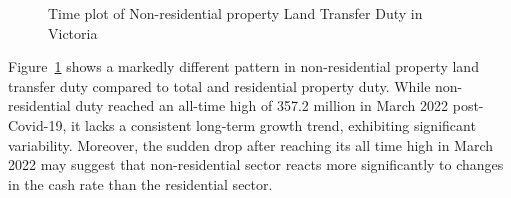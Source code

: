 \documentclass[
  11pt,
  a4paper,
]{article}
\begin{document}
\begin{figure}


\caption{\label{fig-nonrestrend}Time plot of Non-residential property
Land Transfer Duty in Victoria}

\end{figure}%

Figure~\ref{fig-nonrestrend} shows a markedly different pattern in
non-residential property land transfer duty compared to total and
residential property duty. While non-residential duty reached an
all-time high of 357.2 million in March 2022 post-Covid-19, it lacks a
consistent long-term growth trend, exhibiting significant variability.
Moreover, the sudden drop after reaching its all time high in March 2022
may suggest that non-residential sector reacts more significantly to
changes in the cash rate than the residential sector.
\end{document}
